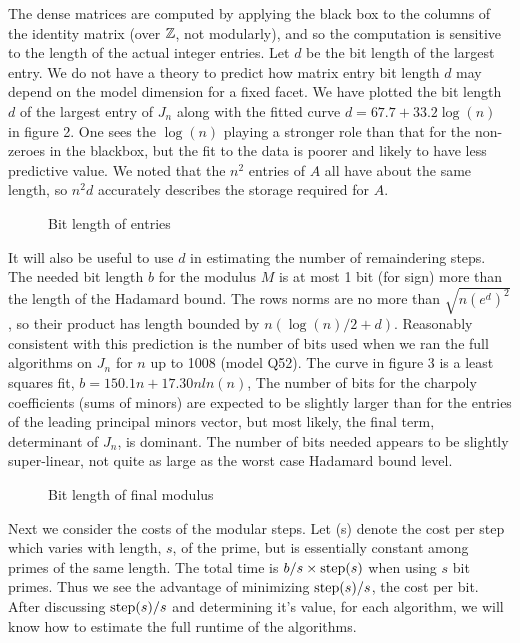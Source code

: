 \documentclass{acm_proc_article-sp}
\begin{document}
The dense matrices are computed by applying the black box to the columns of the 
identity matrix (over $\mathbb Z$, not modularly), and so the computation is 
sensitive to the length of the 
actual integer entries.
Let $d$ be the bit length of the 
largest entry.  
We do not have a theory to predict how matrix entry bit length $d$ may depend on the 
model dimension for a fixed facet. 
We have plotted the bit length $d$ of the largest entry of $J_n$ along with
the fitted curve $d = 67.7 + 33.2\log(n)$ in figure 2.  
One sees the $\log(n)$ playing a stronger role than that for the non-zeroes in the blackbox,
but the fit to the data is poorer and likely to have less predictive value.
We noted that the $n^2$ entries of $A$ all have about the same length, so $n^2 d$ accurately
describes the storage required for $A$.
\begin{figure}[h] %
\caption{Bit length of entries}
\end{figure}

It will also be useful to use $d$ in estimating the number of remaindering steps.
The needed bit length $b$ for the modulus $M$ is at most 1 bit (for sign) more 
than the length of the Hadamard bound.  The rows norms are no more than \(\sqrt{n(e^d)^2}\),
so their product has length bounded by $n(\log(n)/2 + d)$.
Reasonably consistent with this prediction is the number of bits used when we ran
the full algorithms on $J_n$ for $n$ up to 1008 (model Q52).  
The curve in figure 3 is a least squares fit,
$b = 150.1 n + 17.30n ln(n)$,
The number of bits for the charpoly coefficients (sums of minors) are expected 
to be slightly larger than for the entries of the  leading principal minors vector,
but most likely, the final term, determinant of $J_n$, is dominant.  
The number of bits needed appears to be slightly super-linear, not quite as large as
the worst case Hadamard bound level.  
\begin{figure}[h] %
\caption{Bit length of final modulus}
\end{figure}

Next we consider the costs of the modular steps.
Let \step(s) denote the cost per step which varies with length, $s$, of the prime, 
but is essentially constant among primes of the same length.
The total time  is $b/s \times \mbox{step}(s)$ when using $s$ bit primes. 
Thus we see the advantage of minimizing $\mbox{step}(s)/s$, the cost per bit.
After discussing $\mbox{step}(s)/s$ and determining it's value, for each algorithm,  
we will know how to estimate the full runtime of the algorithms.
\end{document}
